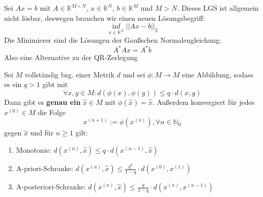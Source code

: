 \documentclass{report}
\begin{document}
 {
  Sei $Ax = b$ mit $A\in \mathbb{K}^{M \times N}$, 
  $x \in\mathbb{K}^N$, $b \in\mathbb{K}^M$ und 
  $M > N$. 
  Dieses LGS ist allgemein nicht lösbar, 
  deswegen brauchen wir einen neuen Lösungsbegriff:
  \[
    \inf_{x \in\mathbb{K}^N} ||Ax - b||_2
  \]
  Die Minimierer sind die Lösungen der Gaußschen 
  Normalengleichung:
  \[
    A^*Ax = A^*b
  \]
  Also eine Alternative zu der QR-Zerlegung
}
 {
  Sei $M$ vollständig bzg. einer Metrik $d$
  und sei $\phi: M \to M$ eine Abbildung, 
  sodass es ein $q > 1$ gibt mit
  \[
    \forall x,y \in M: d(\phi(x), \phi(y))
    \leq q \cdot d(x, y) 
\]
  Dann gibt es {\bf genau ein} $\hat{x} \in M$ mit 
  $\phi(\hat{x}) = \hat{x}$. Außerdem konvergiert für 
  jedes $x^{(0)} \in M$ die Folge
  \[
    x^{(n+1)} := \phi(x^{(n)}), \forall n\in \mathbb{N}_0
  \]
  gegen $\hat{x}$ und für $n \ge 1$ gilt:

  \begin{enumerate}[label=(\alph*)]
    \item Monotonie: $d(x^{(n)}, \hat{x}) 
      \leq q \cdot d(x^{(n-1)}, \hat{x})$
    \item A-priori-Schranke: $d(x^{(n)}, \hat{x})
      \leq \frac{q^n}{1-q} \cdot d(x^{(0)}, x^{(1)})$
    \item A-posteriori-Schranke: $d(x^{(n)}, \hat{x})
      \leq \frac{q}{1-q} \cdot d(x^{(n)}, x^{(n-1)})$
  \end{enumerate}
}
\end{document}
